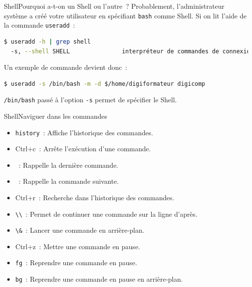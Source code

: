 \documentclass{beamer}
\begin{document}
    \begin{frame}[fragile]{Shell}{Pourquoi a-t-on un Shell ou l'autre~?}
        Probablement, l'administrateur système a créé votre utilisateur en spécifiant \lstinline{bash} comme Shell.
        \bigbreak
        Si on lit l'aide de la commande \lstinline{useradd}~:
        \begin{lstlisting}[language=bash]
$ useradd -h | grep shell
  -s, --shell SHELL               interpréteur de commandes de connexion du nouveau compte
        \end{lstlisting}
        \bigbreak
        Un exemple de commande devient donc~:
        \begin{lstlisting}[language=bash]
$ useradd -s /bin/bash -m -d $/home/digiformateur digicomp
        \end{lstlisting}
        \bigbreak
        \lstinline{/bin/bash} passé à l'option \lstinline{-s} permet de spécifier le Shell.
    \end{frame}

    \begin{frame}{Shell}{Naviguer dans les commandes}
        \begin{itemize}
            \item \lstinline{history}~: Affiche l'historique des commandes.
            \item Ctrl+c~: Arrête l'exécution d'une commande.
            \item {}~: Rappelle la dernière commande.
            \item {}~: Rappelle la commande suivante.
            \item Ctrl+r~: Recherche dans l'historique des commandes.
            \item \lstinline{\\}~: Permet de continuer une commande sur la ligne d'après.
            \item \lstinline{\&}~: Lancer une commande en arrière-plan.
            \item Ctrl+z~: Mettre une commande en pause.
            \item \lstinline{fg}~: Reprendre une commande en pause.
            \item \lstinline{bg}~: Reprendre une commande en pause en arrière-plan.
        \end{itemize}
    \end{frame}
\end{document}
